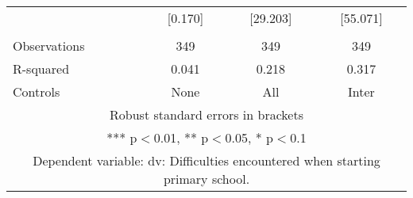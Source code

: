 \begin{tabular}{lccc}
 & [0.170] & [29.203] & [55.071] \\
 &  &  &  \\
Observations & 349 & 349 & 349 \\
R-squared & 0.041 & 0.218 & 0.317 \\
 Controls & None & All & Inter \\ \hline
\multicolumn{4}{c}{ Robust standard errors in brackets} \\
\multicolumn{4}{c}{ *** p$<$0.01, ** p$<$0.05, * p$<$0.1} \\
\multicolumn{4}{c}{ Dependent variable: dv: Difficulties encountered when starting primary school.} \\
\end{tabular}

